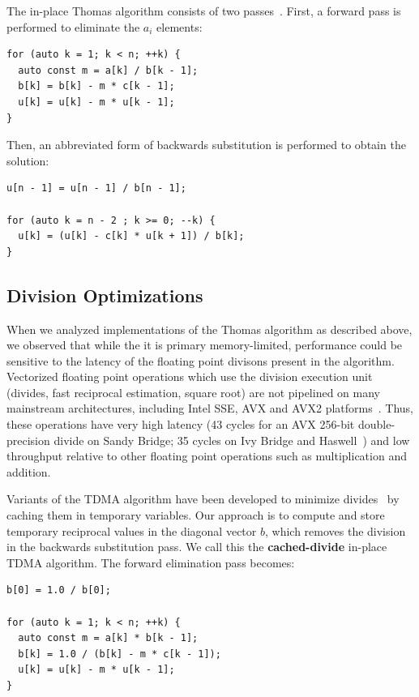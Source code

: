 \documentclass[conference]{IEEEtran}
\begin{document}
The in-place Thomas algorithm consists of two passes~\cite{QuarteroniEtAl2007}. 
First, a forward pass is performed to eliminate the $a_i$ elements:

\begin{lstlisting}
for (auto k = 1; k < n; ++k) {
  auto const m = a[k] / b[k - 1];
  b[k] = b[k] - m * c[k - 1];
  u[k] = u[k] - m * u[k - 1];
} 
\end{lstlisting}

Then, an abbreviated form of backwards substitution is performed to obtain the
solution:

\begin{lstlisting}
u[n - 1] = u[n - 1] / b[n - 1];

for (auto k = n - 2 ; k >= 0; --k) {
  u[k] = (u[k] - c[k] * u[k + 1]) / b[k];
} 
\end{lstlisting}


\subsection{Division Optimizations}

When we analyzed implementations of the Thomas algorithm as described above, we
observed that while the it is primary memory-limited, performance could be
sensitive to the latency of the floating point divisons present in the
algorithm. Vectorized floating point operations which use the division
execution unit (divides, fast reciprocal estimation, square root) are not
pipelined on many mainstream architectures, including Intel SSE, AVX and AVX2
platforms~\cite{}. Thus, these operations have very high latency (43 cycles for
an AVX 256-bit double-precision divide on Sandy Bridge; 35 cycles on Ivy Bridge
and Haswell~\cite{}) and low throughput relative to other floating point
operations such as multiplication and addition.

Variants of the TDMA algorithm have been developed to minimize 
  divides~\cite{QuarteroniEtAl2007} by caching them in temporary variables.
Our approach is to compute and store temporary reciprocal values in the
diagonal vector \(b\), which removes the division in the backwards 
substitution pass. We call this the
\textbf{cached-divide} in-place TDMA algorithm. The forward elimination pass
becomes:

\begin{lstlisting}
b[0] = 1.0 / b[0];

for (auto k = 1; k < n; ++k) {
  auto const m = a[k] * b[k - 1];
  b[k] = 1.0 / (b[k] - m * c[k - 1]);
  u[k] = u[k] - m * u[k - 1];
} 
\end{lstlisting}
\end{document}
